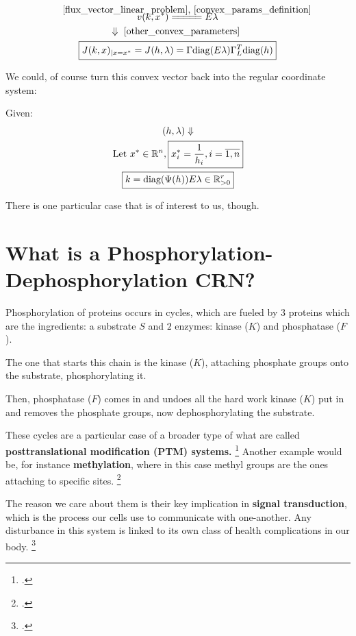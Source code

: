 \begin{gather}\label{jacobian_convex_params}
	v(k, x^*) \eqCuzConvex E \lambda  \notag \\
	\Downarrow \text{ \ref{other_convex_parameters} } \notag \\
	\boxed{J(k,x)_{|x=x^{*}}=J(h,\lambda)=\Gamma \text{diag}(E\lambda)\Gamma_{L}^{T}\text{diag}(h)}
\end{gather}

We could, of course turn this convex vector back into the regular coordinate system:

Given:
\begin{gather}\label{k_convert_back_from_convex}
	(h,\lambda) \Downarrow \notag \\
	\text{Let  } x^* \in \mathbb{R}^n , \boxed{
		x^*_i = \frac{1}{h_i} , i = \overline{1,n}
	} \notag \\
	\boxed{
		k = \text{diag}(\Psi(h)) E \lambda \in \mathbb{R}^r_{> 0}
 }
\end{gather}

There is one particular case that is of interest to us, though.

\section{What is a Phosphorylation-Dephosphorylation CRN?}

Phosphorylation of proteins occurs in cycles, which are fueled by $3$ proteins which are the ingredients: a substrate $S$ and $2$ enzymes: kinase ($K$) and phosphatase ($F$).

The one that starts this chain is the kinase ($K$), attaching phosphate groups onto the substrate, phosphorylating it.

Then, phosphatase ($F$) comes in and undoes all the hard work kinase ($K$) put in and removes the phosphate groups, now dephosphorylating the substrate.

\hfill\break
These cycles are a particular case of a broader type of what are called \textbf{posttranslational modification (PTM) systems.} \footcite{conradi2024} Another example would be, for instance \textbf{methylation}, where in this case methyl groups are the ones attaching to specific sites. \footcite{ramazi2021Ptms, SCHOENHEIMER1939333}

The reason we care about them is their key implication in \textbf{ signal transduction}, which is the process our cells use to communicate with one-another. Any disturbance in this system is linked to its own class of health complications in our body. \footcite{CONRADI2018507, 10.1093/hmg/ddp186, cohen2001Phosphorylation}

